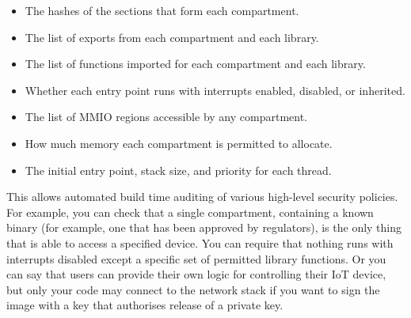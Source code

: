\begin{itemize}
	\item{The hashes of the sections that form each compartment.}
	\item{The list of exports from each compartment and each library.}
	\item{The list of functions imported for each compartment and each library.}
	\item{Whether each entry point runs with interrupts enabled, disabled, or inherited.}
	\item{The list of MMIO regions accessible by any compartment.}
	\item{How much memory each compartment is permitted to allocate.}
	\item{The initial entry point, stack size, and priority for each thread.}
\end{itemize}

This allows automated build time auditing of various high-level security policies.
For example, you can check that a single compartment, containing a known binary (for example, one that has been approved by regulators), is the only thing that is able to access a specified device.
You can require that nothing runs with interrupts disabled except a specific set of permitted library functions.
Or you can say that users can provide their own logic for controlling their IoT device, but only your code may connect to the network stack if you want to sign the image with a key that authorises release of a private key.

